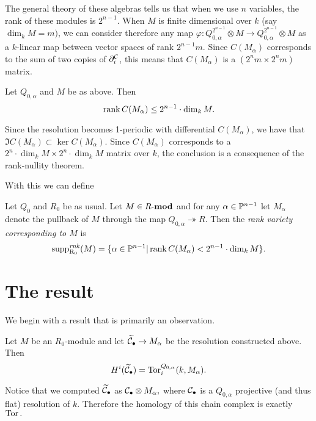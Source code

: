 \documentclass [11pt, proquest] {uwthesis}[2020/02/24]
\DeclareMathOperator{\supprRnaught}{supp^\mathit{rnk}_{R_0}}
\begin{document}
    The general theory of these algebras tells us that when we use $n$ variables, the rank of these modules is $2^{n-1}$. When $M$ is finite dimensional over $k$ (say $\dim_k M=m)$, we can consider therefore any map $\varphi:Q_{0,\alpha}^{2^{n-1}}\otimes M\to Q_{0,\alpha}^{2^{n-1}}\otimes M$ as a $k$-linear map between vector spaces of rank $2^{n-1}m.$ Since $C(M_\alpha)$ corresponds to the sum of two copies of $\partial^{\mathcal{C}}_i$, this means that $C(M_\alpha)$ is a $(2^nm\times 2^nm)$ matrix.
    
    \begin{prop}
        Let $Q_{0,\alpha}$ and $M$ be as above. Then
        \[\operatorname{rank} C(M_\alpha)\le 2^{n-1}\cdot\dim_k M.\]
    \end{prop}
    \begin{prf}
        Since the resolution becomes 1-periodic with differential $C(M_\alpha)$, we have that $\Im C(M_\alpha)\subset \ker C(M_\alpha).$ Since $C(M_\alpha)$ corresponds to a $2^n\cdot\dim_k M\times 2^n\cdot\dim_k M$ matrix over $k$, the conclusion is a consequence of the rank-nullity theorem.
    \end{prf}
    
    With this we can define
    \begin{defn}\label{def:unbosonized-rnk-supp}
        Let $Q_0$ and $R_0$ be as usual. Let $M\in R\text{-}\mathbf{mod}$ and for any $\alpha\in\mathbb{P}^{n-1}$ let $M_\alpha$ denote the pullback of $M$ through the map $Q_{0,\alpha}\twoheadrightarrow R$. Then the \emph{rank variety corresponding to $M$} is
        \[\supprRnaught(M)=\{\alpha\in\bbP^{n-1}|\rank C(M_\alpha) < 2^{n-1}\cdot\dim_k M\}.\]
    \end{defn}
    
    \section{The result}
    We begin with a result that is primarily an observation.
    \begin{lem}\label{lem:tor}
        Let $M$ be an $R_0$-module and let $\widetilde{\mathcal{C}}_\bullet\to M_\alpha$ be the resolution constructed above. Then
        \[H^i(\widetilde{\mathcal{C}}_\bullet)=\operatorname{Tor}_i^{Q_{0,\alpha}}(k,M_\alpha).\]
    \end{lem}
    \begin{prf}
        Notice that we computed $\widetilde{\mathcal{C}}_\bullet$ as $\mathcal{C}_\bullet\otimes M_\alpha,$ where $\mathcal{C}_\bullet$ is a $Q_{0,\alpha}$ projective (and thus flat) resolution of $k$. Therefore the homology of this chain complex is exactly $\operatorname{Tor}.$
    \end{prf}
    
\end{document}
